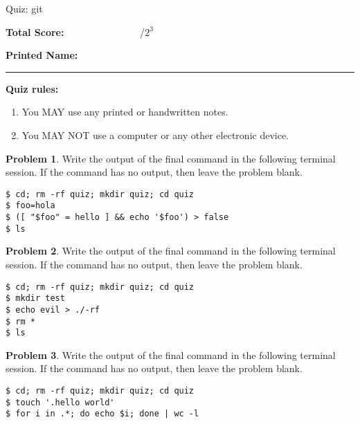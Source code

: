 \documentclass[10pt]{article}
\theoremstyle{definition}
\newtheorem{problem}{Problem}
\begin{document}
\begin{center}
    {
\Large
    Quiz: git
}

    \vspace{0.1in}
\end{center}

\vspace{0.15in}
\noindent
\textbf{Total Score:} ~~~~~~~~~~~~~~~/$2^3$

\vspace{0.2in}
\noindent
\textbf{Printed Name:}

\noindent
\rule{\textwidth}{0.1pt}
\vspace{0.15in}

\noindent
\textbf{Quiz rules:}
\begin{enumerate}
    \item You MAY use any printed or handwritten notes.
    \item You MAY NOT use a computer or any other electronic device.
\end{enumerate}

\noindent

\vspace{0.15in}


\filbreak
\begin{problem}
    Write the output of the final command in the following terminal session.
    If the command has no output, then leave the problem blank.
\end{problem}
\begin{lstlisting}
$ cd; rm -rf quiz; mkdir quiz; cd quiz
$ foo=hola
$ ([ "$foo" = hello ] && echo '$foo') > false
$ ls
\end{lstlisting}
\vspace{1in}

\filbreak
\begin{problem}
    Write the output of the final command in the following terminal session.
    If the command has no output, then leave the problem blank.
\end{problem}
\begin{lstlisting}
$ cd; rm -rf quiz; mkdir quiz; cd quiz
$ mkdir test
$ echo evil > ./-rf
$ rm *
$ ls
\end{lstlisting}
\vspace{2in}

\filbreak
\begin{problem}
    Write the output of the final command in the following terminal session.
    If the command has no output, then leave the problem blank.
\end{problem}
\begin{lstlisting}
$ cd; rm -rf quiz; mkdir quiz; cd quiz
$ touch '.hello world'
$ for i in .*; do echo $i; done | wc -l
\end{lstlisting}
\vspace{2in}
\end{document}
